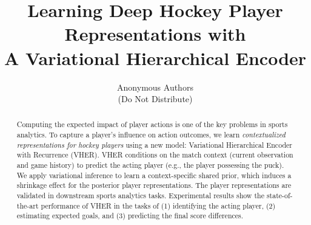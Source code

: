 \documentclass{article}
\title{Learning Deep Hockey Player Representations with \\ A Variational Hierarchical Encoder}
\author{Anonymous Authors\\(Do Not Distribute)}
\begin{document}
\maketitle


\begin{abstract} Computing the expected impact of player actions is one of the key problems in sports analytics. To capture a player's influence on action outcomes, we learn {\em contextualized representations for hockey players} using a new model: Variational Hierarchical Encoder with Recurrence (VHER). VHER conditions on the match context (current observation and game history) to predict the acting player (e.g., the player possessing the puck). We apply variational inference to learn a context-specific shared prior, which induces a shrinkage effect for the posterior player representations. The player representations are validated in downstream sports analytics tasks.  Experimental results show the state-of-the-art performance of VHER in the tasks of (1) identifying the acting player, (2) estimating expected goals, and (3) predicting the final score differences.
\end{abstract}


    
\end{document}
